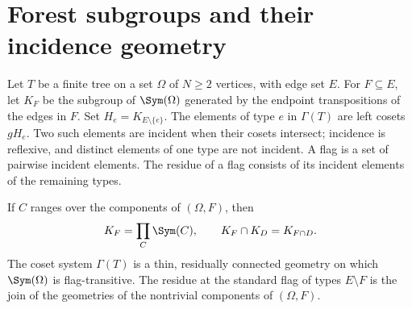 \section{Forest subgroups and their incidence geometry}
Let $T$ be a finite tree on a set $\Omega$ of $N\geq2$ vertices, with edge
set $E$. For $F\subseteq E$, let $K_F$ be the subgroup of $\Sym(\Omega)$
generated by the endpoint transpositions of the edges in $F$. Set
$H_e=K_{E\setminus\{e\}}$. The elements of type $e$ in $\Gamma(T)$ are
left cosets $gH_e$. Two such elements are incident when their cosets
intersect; incidence is reflexive, and distinct elements of one type are
not incident. A flag is a set of pairwise incident elements. The residue
of a flag consists of its incident elements of the remaining types.

\begin{lemma}\label{forest}
If $C$ ranges over the components of $(\Omega,F)$, then
\[
 K_F=\prod_C\Sym(C),\qquad K_F\cap K_D=K_{F\cap D}.
\]
The coset system $\Gamma(T)$ is a thin, residually connected geometry on
which $\Sym(\Omega)$ is flag-transitive. The residue at the standard flag
of types $E\setminus F$ is the join of the geometries of the nontrivial
components of $(\Omega,F)$.
\end{lemma}

